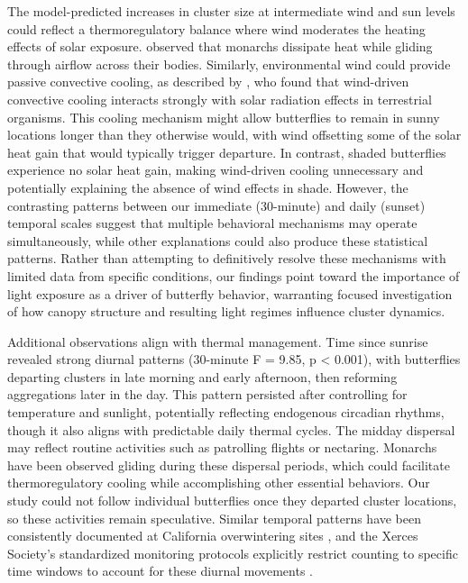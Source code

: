 The model-predicted increases in cluster size at intermediate wind and sun levels could reflect a thermoregulatory balance where wind moderates the heating effects of solar exposure. \textcite{mastersMonarchButterflyDanaus1988} observed that monarchs dissipate heat while gliding through airflow across their bodies. Similarly, environmental wind could provide passive convective cooling, as described by \textcite{riddellWindNicheThermal2025}, who found that wind-driven convective cooling interacts strongly with solar radiation effects in terrestrial organisms. This cooling mechanism might allow butterflies to remain in sunny locations longer than they otherwise would, with wind offsetting some of the solar heat gain that would typically trigger departure. In contrast, shaded butterflies experience no solar heat gain, making wind-driven cooling unnecessary and potentially explaining the absence of wind effects in shade. However, the contrasting patterns between our immediate (30-minute) and daily (sunset) temporal scales suggest that multiple behavioral mechanisms may operate simultaneously, while other explanations could also produce these statistical patterns. Rather than attempting to definitively resolve these mechanisms with limited data from specific conditions, our findings point toward the importance of light exposure as a driver of butterfly behavior, warranting focused investigation of how canopy structure and resulting light regimes influence cluster dynamics.

Additional observations align with thermal management. Time since sunrise revealed strong diurnal patterns (30-minute F = 9.85, p < 0.001), with butterflies departing clusters in late morning and early afternoon, then reforming aggregations later in the day. This pattern persisted after controlling for temperature and sunlight, potentially reflecting endogenous circadian rhythms, though it also aligns with predictable daily thermal cycles. The midday dispersal may reflect routine activities such as patrolling flights or nectaring. Monarchs have been observed gliding during these dispersal periods, which could facilitate thermoregulatory cooling while accomplishing other essential behaviors. Our study could not follow individual butterflies once they departed cluster locations, so these activities remain speculative. Similar temporal patterns have been consistently documented at California overwintering sites \parencite{tuskesOverwinteringEcologyMonarch1978,chaplinEnergyReservesMetabolic1982}, and the Xerces Society's standardized monitoring protocols explicitly restrict counting to specific time windows to account for these diurnal movements \parencite{xercessocietyStepbyStepWesternMonarch2017}.


